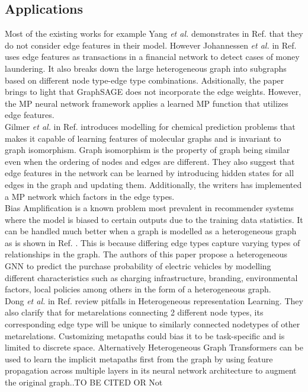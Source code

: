 \documentclass{report} %
\begin{document}
\subsection{Applications}\label{subsec:HGNN Applications}
Most of the existing works for example Yang \textit{et al.} demonstrates in Ref. \cite{HGNN-2020} that they do not consider edge features in their model. 
However Johannessen \textit{et al.} in Ref. \cite{ML HGNN-2023} uses edge features as transactions in a financial network to detect cases of money laundering.
It also breaks down the large heterogeneous graph into subgraphs based on different node type-edge type combinations. 
Adsitionally, the paper brings to light that GraphSAGE does not incorporate the edge weights.
However, the \ac{MP} neural network framework applies a learned \ac{MP} function that utilizes edge features.\\
Gilmer \textit{et al.} in Ref. \cite{QC-MP-2017} introduces modelling for chemical prediction problems that makes it capable of learning features of molecular graphs 
and is invariant to graph isomorphism. Graph isomorphism is the property of graph being similar even when the ordering of nodes and edges are different.
They also suggest that edge features in the network can be learned by introducing hidden states for all edges in the graph and updating them.
Additionally, the writers has implemented a \ac{MP} network which factors in the edge types.\\
Bias Amplification is a known problem most prevalent in recommender systems where the model is biased to certain outputs due to the training data statistics.
It can be handled much better when a graph is modelled as a heterogeneous graph as is shown in Ref. \cite{EV HGNN-2023}. This is because differing 
edge types capture varying types of relationships in the graph. The authors of this paper propose a heterogeneous \ac{GNN} to predict the purchase probability of 
electric vehicles by modelling different characteristics such as charging infrastructure, branding, environmental factors, local policies among others in the form of a 
heterogeneous graph.\\
Dong \textit{et al.} in Ref. \cite{HNRL-2020} review pitfalls in Heterogeneous representation Learning. They also clarify that for metarelations connecting 2 different 
node types, its corresponding edge type will be unique to similarly connected nodetypes of other metarelations. Customizing metapaths could bias it to be task-specific 
and is limited to discrete space.
Alternatively Heterogeneous Graph Transformers can be used to learn the implicit metapaths first from the graph by using feature propagation across multiple layers in its 
neural network architecture to augment the original graph..TO BE CITED OR Not
\end{document}
